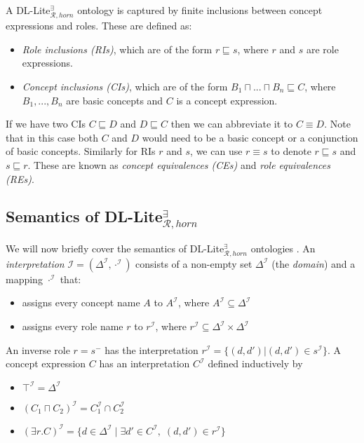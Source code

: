 A DL-Lite$_{\mathcal{R}, horn}^{\exists}$ ontology is captured by finite inclusions between concept expressions and roles. These are defined as: 
\begin{itemize}
    \setlength\itemsep{1em}
    \item \emph{Role inclusions (RIs)}, which are of the form $r\sqsubseteq s$, where $r$ and $s$ are role expressions.
    \item \emph{Concept inclusions (CIs)}, which are of the form $B_1 \sqcap ... \sqcap B_n \sqsubseteq C$, where $B_1, ..., B_n$ are basic concepts and $C$ is a concept expression.
\end{itemize}

If we have two CIs $C\sqsubseteq D$ and $D \sqsubseteq C$ then we can abbreviate it to $C \equiv D$. Note that in this case both $C$ and $D$ would need to be a basic concept or a conjunction of basic concepts. Similarly for RIs $r$ and $s$, we can use $r\equiv s$ to denote $r\sqsubseteq s$ and $s \sqsubseteq r$. These are known as \emph{concept equivalences (CEs)} and \emph{role equivalences (REs)}.

\subsection{Semantics of DL-Lite$_{\mathcal{R}, horn}^{\exists}$}
We will now briefly cover the semantics of DL-Lite$_{\mathcal{R}, horn}^{\exists}$ ontologies \cite{baader_horrocks_lutz_sattler_2017}. An \emph{interpretation} $\mathcal{I} = (\Delta^{\mathcal{I}}, \cdot^{\mathcal{I}})$ consists of a non-empty set $\Delta^{\mathcal{I}}$ (the \emph{domain}) and a mapping $\cdot^{\mathcal{I}}$ that:
\begin{itemize}
    \item assigns every concept name $A$ to $A^{\mathcal{I}}$, where $A^{\mathcal{I}}\subseteq \Delta^{\mathcal{I}}$
    \item assigns every role name $r$ to  $r^{\mathcal{I}}$, where $r^{\mathcal{I}}\subseteq \Delta^{\mathcal{I}}\times \Delta^{\mathcal{I}}$
\end{itemize}
An inverse role $r = s^-$ has the interpretation $r^{\mathcal{I}}=\{(d, d') | (d,d')\in s^{\mathcal{I}}\}$. A concept expression $C$ has an interpretation $C^{\mathcal{I}}$ defined inductively by
\begin{itemize}
    \item $ \top^{\mathcal{I}} = \Delta^{\mathcal{I}} $
    \item $ (C_{1} \sqcap C_{2})^{\mathcal{I}} = C_{1}^{\mathcal{I}} \cap C_{2}^{\mathcal{I}} $
    \item $ (\exists r.C)^{\mathcal{I}} = \{d\in \Delta ^{\mathcal{I}}\;|\; \exists d' \in C^{\mathcal{I}}, \; (d,d')\in r^{\mathcal{I}}\} $
\end{itemize}

